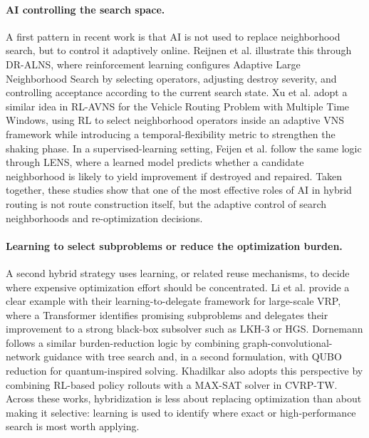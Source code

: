 \paragraph{AI controlling the search space.}
A first pattern in recent work is that AI is not used to replace neighborhood search, but to control it adaptively online. Reijnen et al. \cite{reijnen2024} illustrate this through DR-ALNS, where reinforcement learning configures Adaptive Large Neighborhood Search by selecting operators, adjusting destroy severity, and controlling acceptance according to the current search state. Xu et al. \cite{xuLearningSearchVehicle} adopt a similar idea in RL-AVNS for the Vehicle Routing Problem with Multiple Time Windows, using RL to select neighborhood operators inside an adaptive VNS framework while introducing a temporal-flexibility metric to strengthen the shaking phase. In a supervised-learning setting, Feijen et al. \cite{feijen2024} follow the same logic through LENS, where a learned model predicts whether a candidate neighborhood is likely to yield improvement if destroyed and repaired. Taken together, these studies show that one of the most effective roles of AI in hybrid routing is not route construction itself, but the adaptive control of search neighborhoods and re-optimization decisions.

\paragraph{Learning to select subproblems or reduce the optimization burden.}
A second hybrid strategy uses learning, or related reuse mechanisms, to decide where expensive optimization effort should be concentrated. Li et al. \cite{liEtAl2021} provide a clear example with their learning-to-delegate framework for large-scale VRP, where a Transformer identifies promising subproblems and delegates their improvement to a strong black-box subsolver such as LKH-3 or HGS. Dornemann \cite{dornemann2023} follows a similar burden-reduction logic by combining graph-convolutional-network guidance with tree search and, in a second formulation, with QUBO reduction for quantum-inspired solving. Khadilkar \cite{khadilkar2022} also adopts this perspective by combining RL-based policy rollouts with a MAX-SAT solver in CVRP-TW. Across these works, hybridization is less about replacing optimization than about making it selective: learning is used to identify where exact or high-performance search is most worth applying.

